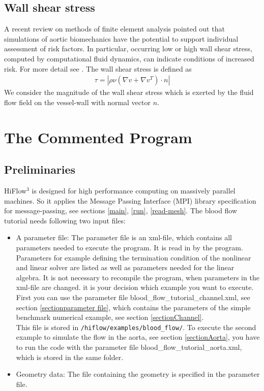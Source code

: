 \documentclass[a4paper, 11pt, twoside]{article}
\begin{document}
\subsection{Wall shear stress}\label{wss}
A recent review on methods of finite element analysis pointed out that simulations of aortic biomechanics have the potential to support individual assessment of risk factors. 
In particular, occurring low or high wall shear stress, computed by computational fluid dynamics, can indicate conditions of increased risk. For more detail see \cite{cardio}. 
The wall shear stress is defined as
\begin{align*}
\tau = |\rho \nu (\nabla v + \nabla v^T) \cdot n|
\end{align*}
We consider the magnitude of the wall shear stress which is exerted by the fluid flow field on the vessel-wall with normal vector $n$. \\

\section{The Commented Program}

\subsection{Preliminaries}
HiFlow$^3$ is designed for high performance computing on massively parallel machines. 
So it applies the Message Passing Interface (MPI) library specification for message-passing, see sections \ref{main}, \ref{run}, \ref{read-mesh}. 
The blood flow tutorial needs following two input files:
\begin{itemize}
\item A parameter file: The parameter file is an xml-file, which contains all parameters needed to execute the program. It is read in by the program. Parameters for example defining the termination condition of the nonlinear and linear solver are listed as well as parameters needed for the linear algebra. 
It is not necessary to recompile the program, when parameters in the xml-file are changed. 
it is your decision which example you want to execute. First you can use the parameter file blood\_flow\_tutorial\_channel.xml, see section \ref{sectionparameter file}, which contains the parameters of the simple benchmark numerical example, see section \ref{sectionChannel}.\\
This file is stored in \verb'/hiflow/examples/blood_flow/'. To execute the second example to simulate the flow in the aorta, see section \ref{sectionAorta},
you have to run the code with the parameter file blood\_flow\_tutorial\_aorta.xml, which is stored in the same folder.
\item Geometry data: The file containing the geometry is specified in the parameter file. 
\end{itemize}
\end{document}
